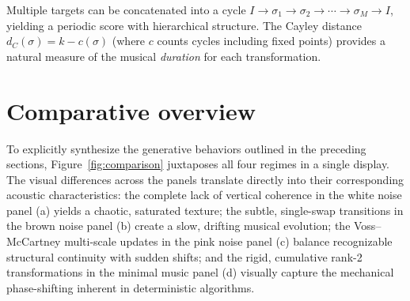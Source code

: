 \documentclass[
  twocolumn,
  aps,
  pra,
  showkeys,
  amsmath,amssymb,
  longbibliography
]{revtex4-2}
\begin{document}
Multiple targets can be concatenated into a cycle
$I\to\sigma_1\to\sigma_2\to\cdots\to\sigma_M\to I$,
yielding a periodic score with hierarchical structure.
The Cayley distance
$d_C(\sigma)=k-c(\sigma)$ (where $c$ counts cycles including
fixed points) provides a natural measure of the musical
\emph{duration} for each transformation.

\section{Comparative overview}
\label{sec:compare}

To explicitly synthesize the generative behaviors outlined in the preceding sections, Figure~\ref{fig:comparison} juxtaposes all four regimes in a single display.
The visual differences across the panels translate directly into their corresponding acoustic characteristics: the complete lack of vertical coherence in the white noise panel (a) yields a chaotic, saturated texture; the subtle, single-swap transitions in the brown noise panel (b) create a slow, drifting musical evolution; the Voss--McCartney multi-scale updates in the pink noise panel (c) balance recognizable structural continuity with sudden shifts; and the rigid, cumulative rank-2 transformations in the minimal music panel (d) visually capture the mechanical phase-shifting inherent in deterministic algorithms.
\end{document}
